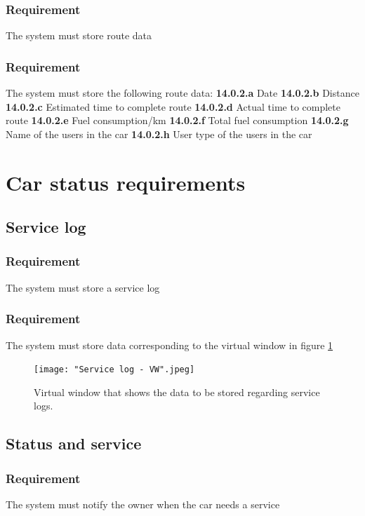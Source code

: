 \documentclass{article}
\begin{document}
{    \subsubsection{Requirement}
\hfill \break 
\- \- \-The system must store route data
    \subsubsection{Requirement}
\hfill \break 
\- \- \-The system must store the following route data:
\hfill \break 
\indent
\textbf{14.0.2.a} Date
\hfill \break 
\indent
\textbf{14.0.2.b} Distance
\hfill \break 
\indent
\textbf{14.0.2.c} Estimated time to complete route
\hfill \break 
\indent
\textbf{14.0.2.d} Actual time to complete route
\hfill \break 
\indent
\textbf{14.0.2.e} Fuel consumption/km
\hfill \break 
\indent
\textbf{14.0.2.f} Total fuel consumption
\hfill \break 
\indent
\textbf{14.0.2.g} Name of the users in the car
\hfill \break 
\indent
\textbf{14.0.2.h} User type of the users in the car

\section{Car status requirements}
  \subsection{Service log}
      \subsubsection{Requirement}
\hfill \break 
\- \- \-The system must store a service log
      \subsubsection{Requirement}
\hfill \break 
\- \- \- The system must store data corresponding to the virtual window in figure \ref{fig:Virtual window Service log}


\begin{figure}[htb]    
 \centering
  \texttt{[image: "Service log - VW".jpeg]}
  \caption{Virtual window that shows the data to be stored regarding service logs.}
  \label{fig:Virtual window Service log}
\end{figure}
  \subsection{Status and service}
      \subsubsection{Requirement}
\hfill \break 
\- \- \-The system must notify the owner when the car needs a service
}
\end{document}
